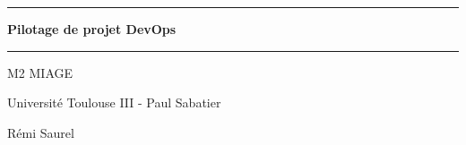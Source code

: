 \begin{figure}%
    \vspace{3cm}
\end{figure}

\begin{titlepage}
    \begin{center}
        \noindent\rule{\textwidth}{0,5pt}

        \vspace{1cm}

        \huge
        \textbf{Pilotage de projet DevOps}
        \vspace{0,7cm}

        \noindent\rule{\textwidth}{0,5pt}

        \vspace{2cm}

        \Large
        M2 MIAGE
        \vspace{1cm}

        Université Toulouse III - Paul Sabatier

        \vspace{8cm}

        \Large
        Rémi Saurel

        \vspace{1cm}
    \end{center}
\end{titlepage}

\thispagestyle{empty}
\newpage